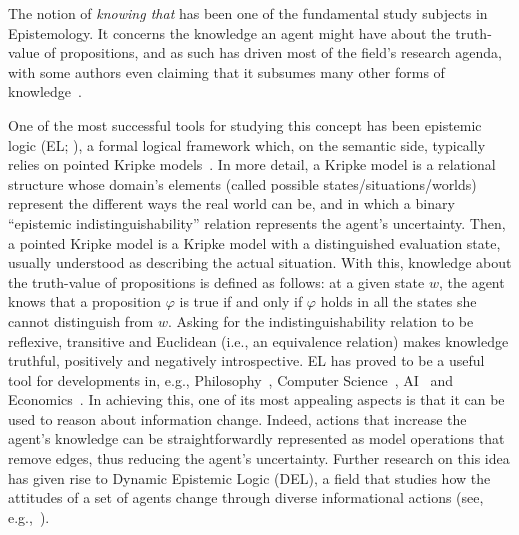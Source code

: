 The notion of \emph{knowing that} has been one of the fundamental study subjects in Epistemology. It concerns the knowledge an agent might have about the truth-value of propositions, and as such has driven most of the field's research agenda, with some authors even claiming that it subsumes many other forms of knowledge~\cite{BoenLycan75}. 
 
One of the most successful tools for studying this concept has been epistemic logic (EL; \cite{Hintikka:kab}), a formal logical framework which, on the semantic side, typically relies on pointed Kripke models~\cite{mlbook,HML}. In more detail, a Kripke model is a relational structure whose domain's elements (called possible states/situations/worlds) represent the different ways the real world can be, and in which a binary ``epistemic indistinguishability'' relation represents the agent's uncertainty. Then, a pointed Kripke model is a Kripke model with a distinguished evaluation state, usually understood as describing the actual situation. With this, knowledge about the truth-value of propositions is defined as follows: at a given state $w$, the agent knows that a proposition $\varphi$ is true if and only if $\varphi$ holds in all the states she cannot distinguish from $w$. Asking for the indistinguishability relation to be reflexive, transitive and Euclidean (i.e., an equivalence relation) makes knowledge truthful, positively and negatively introspective. EL has proved to be a useful tool for developments in, e.g., Philosophy~\cite{rfe,Holliday2018}, Computer Science~\cite{RAK}, AI~\cite{elfaics} and Economics~\cite{egepgt}. In achieving this, one of its most appealing aspects is that it can be used to reason about information change. Indeed, actions that increase the agent's knowledge can be straightforwardly represented as model operations that remove edges, thus reducing the agent's uncertainty. Further research on this idea has given rise to Dynamic Epistemic Logic (DEL), a field that studies how the attitudes of a set of agents change through diverse informational actions (see, e.g.,~\cite{DELbook,vanBenthem2011ldii}). 


